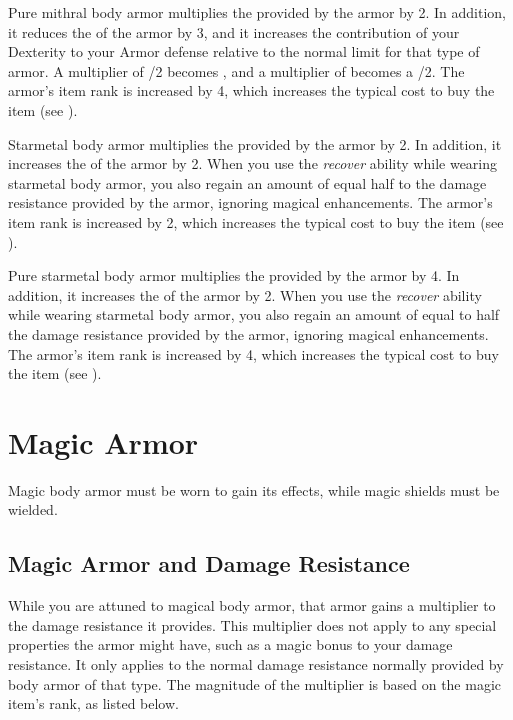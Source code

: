          Pure mithral body armor multiplies the  provided by the armor by 2.
        In addition, it reduces the  of the armor by 3, and it increases the contribution of your Dexterity to your Armor defense relative to the normal limit for that type of armor.
        A multiplier of /2 becomes , and a multiplier of  becomes a /2.
        The armor's item rank is increased by 4, which increases the typical cost to buy the item (see ).

         Starmetal body armor multiplies the  provided by the armor by 2.
        In addition, it increases the  of the armor by 2.
        When you use the \textit{recover} ability while wearing starmetal body armor, you also regain an amount of  equal half to the damage resistance provided by the armor, ignoring magical enhancements.
        The armor's item rank is increased by 2, which increases the typical cost to buy the item (see ).

         Pure starmetal body armor multiplies the  provided by the armor by 4.
        In addition, it increases the  of the armor by 2.
        When you use the \textit{recover} ability while wearing starmetal body armor, you also regain an amount of  equal to half the damage resistance provided by the armor, ignoring magical enhancements.
        The armor's item rank is increased by 4, which increases the typical cost to buy the item (see ).

\newpage
\section{Magic Armor}
    Magic body armor must be worn to gain its effects, while magic shields must be wielded.

    \subsection{Magic Armor and Damage Resistance}
        While you are attuned to magical body armor, that armor gains a multiplier to the damage resistance it provides.
        This multiplier does not apply to any special properties the armor might have, such as a magic bonus to your damage resistance.
        It only applies to the normal damage resistance normally provided by body armor of that type.
        The magnitude of the multiplier is based on the magic item's rank, as listed below.

